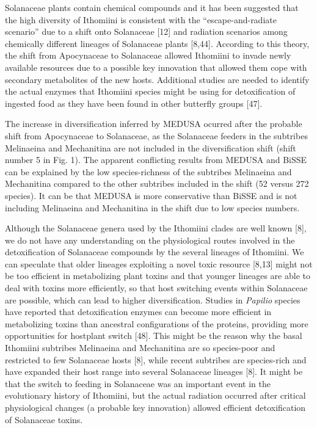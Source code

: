 \documentclass[10pt]{article}
\begin{document}
Solanaceae plants contain chemical compounds and it has been suggested
that the high diversity of Ithomiini is consistent with the
``escape-and-radiate scenario'' due to a shift onto Solanaceae {[}12{]}
and radiation scenarios among chemically different lineages of
Solanaceae plants {[}8,44{]}. According to this theory, the shift from
Apocynaceae to Solanaceae allowed Ithomiini to invade newly available
resources due to a possible key innovation that allowed them cope with
secondary metabolites of the new hosts. Additional studies are needed to
identify the actual enzymes that Ithomiini species might be using for
detoxification of ingested food as they have been found in other
butterfly groups {[}47{]}.

The increase in diversification inferred by MEDUSA ocurred after the
probable shift from Apocynaceae to Solanaceae, as the Solanaceae feeders
in the subtribes Melinaeina and Mechanitina are not included in the
diversification shift (shift number 5 in Fig. 1). The apparent
conflicting results from MEDUSA and BiSSE can be explained by the low
species-richness of the subtribes Melinaeina and Mechanitina compared to
the other subtribes included in the shift (52 versus 272 species). It
can be that MEDUSA is more conservative than BiSSE and is not including
Melinaeina and Mechanitina in the shift due to low species numbers.

Although the Solanaceae genera used by the Ithomiini clades are well
known {[}8{]}, we do not have any understanding on the physiological
routes involved in the detoxification of Solanaceae compounds by the
several lineages of Ithomiini. We can speculate that older lineages
exploiting a novel toxic resource {[}8,13{]} might not be too efficient
in metabolizing plant toxins and that younger lineages are able to deal
with toxins more efficiently, so that host switching events within
Solanaceae are possible, which can lead to higher diversification.
Studies in \emph{Papilio} species have reported that detoxification
enzymes can become more efficient in metabolizing toxins than ancestral
configurations of the proteins, providing more opportunities for
hostplant switch {[}48{]}. This might be the reason why the basal
Ithomiini subtribes Melinaeina and Mechanitina are so species-poor and
restricted to few Solanaceae hosts {[}8{]}, while recent subtribes are
species-rich and have expanded their host range into several Solanaceae
lineages {[}8{]}. It might be that the switch to feeding in Solanaceae
was an important event in the evolutionary history of Ithomiini, but the
actual radiation occurred after critical physiological changes (a
probable key innovation) allowed efficient detoxification of Solanaceae
toxins.
\end{document}
